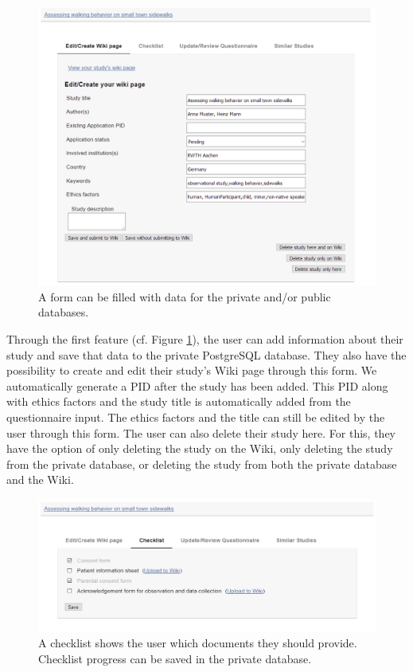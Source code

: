 \documentclass[10pt]{article}
\begin{document}
\begin{figure}[H]
\centering
	\includegraphics[width=1\textwidth]{img/studysub1.png}
	\caption{A form can be filled with data for the private and/or public databases.}
	\label{fig:studysub1}
\end{figure}

Through the first feature (cf. Figure \ref{fig:studysub1}), the user can add information about their study and save that data to the private PostgreSQL database. They also have the possibility to create and edit their study's Wiki page through this form. We automatically generate a PID after the study has been added. This PID along with ethics factors and the study title is automatically added from the questionnaire input. The ethics factors and the title can still be edited by the user through this form. The user can also delete their study here. For this, they have the option of only deleting the study on the Wiki, only deleting the study from the private database, or deleting the study from both the private database and the Wiki. \\

\begin{figure}[H]
\centering
	\includegraphics[width=1\textwidth]{img/studysub2.png}
	\caption{A checklist shows the user which documents they should provide. Checklist progress can be saved in the private database.}
	\label{fig:studysub2}
\end{figure}
\end{document}
